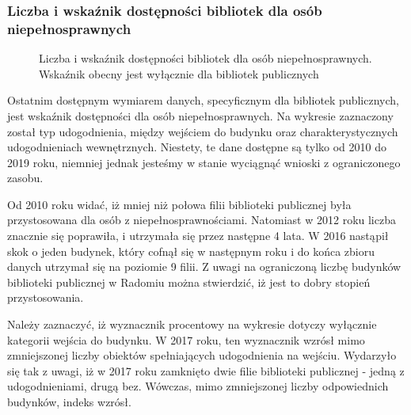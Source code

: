 \documentclass[12pt]{article}
\begin{document}
\subsubsection{Liczba i wskaźnik dostępności bibliotek dla osób niepełnosprawnych}
\begin{figure}[H]
    
    \caption{Liczba i wskaźnik dostępności bibliotek dla osób niepełnosprawnych. Wskaźnik obecny jest wyłącznie 
    dla bibliotek publicznych}
\end{figure}

Ostatnim dostępnym wymiarem danych, specyficznym dla bibliotek publicznych, jest wskaźnik dostępności dla osób niepełnosprawnych. Na wykresie zaznaczony został
typ udogodnienia, między wejściem do budynku oraz charakterystycznych udogodnieniach wewnętrznych. Niestety, te dane dostępne są tylko od 2010 
do 2019 roku, niemniej jednak jesteśmy w stanie wyciągnąć wnioski z ograniczonego zasobu.

Od 2010 roku widać, iż mniej niż połowa filii biblioteki publicznej była przystosowana dla osób z niepełnosprawnościami. Natomiast w 2012 roku liczba znacznie się poprawiła, 
i utrzymała się przez następne 4 lata. W 2016 nastąpił skok o jeden budynek, który cofnął się w następnym roku i do końca zbioru danych utrzymał się na poziomie 9 filii.
Z uwagi na ograniczoną liczbę budynków biblioteki publicznej w Radomiu można stwierdzić, iż jest to dobry stopień przystosowania.

Należy zaznaczyć, iż wyznacznik procentowy na wykresie dotyczy wyłącznie kategorii wejścia do budynku. W 2017 roku, ten wyznacznik wzrósł mimo zmniejszonej liczby obiektów 
spełniających udogodnienia na wejściu. Wydarzyło się tak z uwagi, iż w 2017 roku zamknięto dwie filie biblioteki publicznej - jedną z udogodnieniami, drugą bez. Wówczas, 
mimo zmniejszonej liczby odpowiednich budynków, indeks wzrósł.



\newpage
\end{document}
